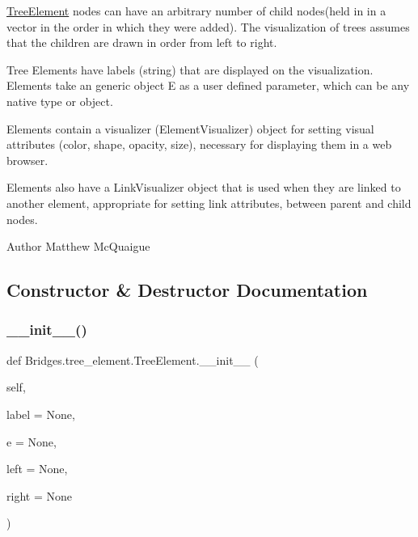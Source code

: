 \mbox{\hyperlink{class_bridges_1_1tree__element_1_1_tree_element}{Tree\+Element}} nodes can have an arbitrary number of child nodes(held in in a vector in the order in which they were added). The visualization of trees assumes that the children are drawn in order from left to right.

Tree Elements have labels (string) that are displayed on the visualization. Elements take an generic object E as a user defined parameter, which can be any native type or object.

Elements contain a visualizer (Element\+Visualizer) object for setting visual attributes (color, shape, opacity, size), necessary for displaying them in a web browser.

Elements also have a Link\+Visualizer object that is used when they are linked to another element, appropriate for setting link attributes, between parent and child nodes.

\begin{DoxyAuthor}{Author}
Matthew Mc\+Quaigue 
\end{DoxyAuthor}


\subsection{Constructor \& Destructor Documentation}
\mbox{\label{class_bridges_1_1tree__element_1_1_tree_element_a62b157ce953614dc9ac28b5361c3febf}} 
\subsubsection{\texorpdfstring{\+\_\+\+\_\+init\+\_\+\+\_\+()}{\_\_init\_\_()}}
{\footnotesize\ttfamily def Bridges.\+tree\+\_\+element.\+Tree\+Element.\+\_\+\+\_\+init\+\_\+\+\_\+ (\begin{DoxyParamCaption}\item[{}]{self,  }\item[{}]{label = {\ttfamily None},  }\item[{}]{e = {\ttfamily None},  }\item[{}]{left = {\ttfamily None},  }\item[{}]{right = {\ttfamily None} }\end{DoxyParamCaption})}



